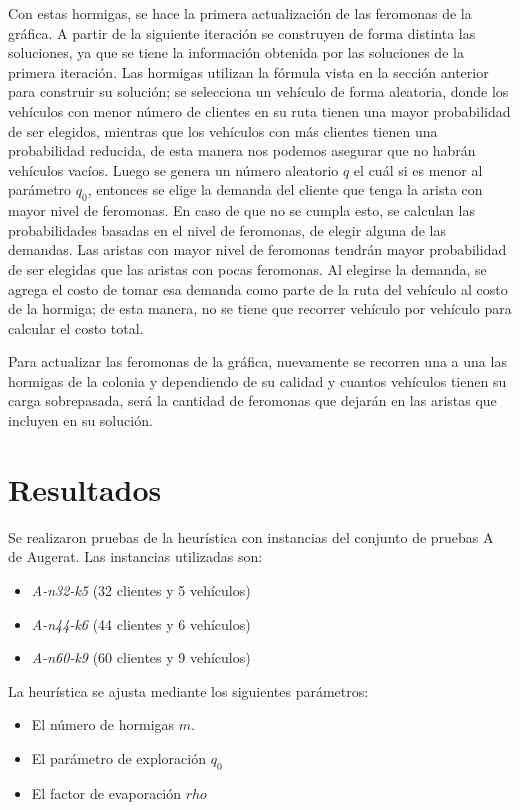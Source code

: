 \documentclass[12pt]{article}
\begin{document}
	Con estas hormigas, se hace la primera actualización de las feromonas de la 
	gráfica. A partir de la siguiente iteración se construyen de forma distinta las
	soluciones, ya que se tiene la información obtenida por las soluciones de la 
	primera iteración. Las hormigas utilizan la fórmula vista en la sección anterior 
	para construir su solución; se selecciona un vehículo de forma aleatoria, donde 
	los vehículos con menor número de clientes en su ruta tienen una mayor 
	probabilidad de ser elegidos, mientras que los vehículos con más clientes tienen 
	una probabilidad reducida, de esta manera nos podemos asegurar que no habrán 
	vehículos vacíos. Luego se genera un número aleatorio $q$ el cuál si es menor
	al parámetro $q_0$, entonces se elige la demanda del cliente que tenga la arista
	con mayor nivel de feromonas. En caso de que no se cumpla esto, se calculan las
	probabilidades basadas en el nivel de feromonas, de elegir alguna de las 
	demandas. Las aristas con mayor nivel de feromonas tendrán mayor probabilidad de
	ser elegidas que las aristas con pocas feromonas.
	Al elegirse la demanda, se agrega el costo de tomar esa demanda como parte de la
	ruta del vehículo al costo de la hormiga; de esta manera, no se tiene que recorrer
	vehículo por vehículo para calcular el costo total.
	
	Para actualizar las feromonas de la gráfica, nuevamente se recorren una a una 
	las hormigas de la colonia y dependiendo de su calidad y cuantos vehículos tienen
	su carga sobrepasada, será la cantidad de feromonas que dejarán en las aristas 
	que incluyen en su solución.
	\section{Resultados}
	
	Se realizaron pruebas de la heurística con instancias del conjunto de 
	pruebas A de Augerat. Las instancias utilizadas son:
	
	\begin{itemize}
		\item \textit{A-n32-k5} (32 clientes y 5 vehículos)
		\item \textit{A-n44-k6} (44 clientes y 6 vehículos)
		\item \textit{A-n60-k9} (60 clientes y 9 vehículos)
	\end{itemize}

	La heurística se ajusta mediante los siguientes parámetros:
	
	\begin{itemize}
		\item El número de hormigas $m$.
		\item El parámetro de exploración $q_0$
		\item El factor de evaporación $rho$
	\end{itemize}
	
\end{document}
